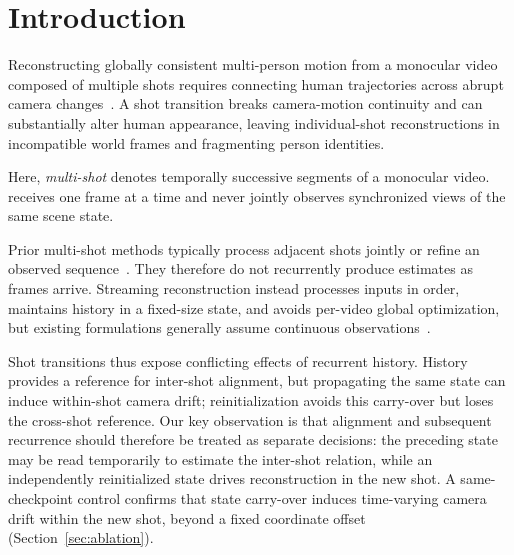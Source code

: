 \section{Introduction}

Reconstructing globally consistent multi-person motion from a monocular video
composed of multiple shots requires connecting human trajectories across
abrupt camera changes~\citep{pavlakos2022multishot,zhang2025humanmm,on2026multithumbs}.
A shot transition breaks camera-motion continuity and can substantially alter
human appearance, leaving individual-shot reconstructions in incompatible
world frames and fragmenting person identities.

Here, \emph{multi-shot} denotes temporally successive segments of a monocular
video. \method{} receives one frame at a time and never jointly observes
synchronized views of the same scene state.

Prior multi-shot methods typically process adjacent shots jointly or refine an
observed sequence~\citep{zhang2025humanmm,on2026multithumbs}. They therefore do
not recurrently produce estimates as frames arrive. Streaming reconstruction
instead processes inputs in order, maintains history in a fixed-size state,
and avoids per-video global optimization, but existing formulations generally
assume continuous observations~\citep{wang2025cut3r,chen2026human3r,zhao2026onlinehmr}.

Shot transitions thus expose conflicting effects of recurrent history.
History provides a reference for inter-shot alignment, but propagating the
same state can induce within-shot camera drift; reinitialization avoids this
carry-over but loses the cross-shot reference. Our key
observation is that alignment and subsequent recurrence should therefore be
treated as separate decisions: the preceding state may be read temporarily to
estimate the inter-shot relation, while an independently reinitialized state
drives reconstruction in the new shot. A same-checkpoint control confirms that state carry-over induces
time-varying camera drift within the new shot, beyond a fixed coordinate offset
(Section~\ref{sec:ablation}).

